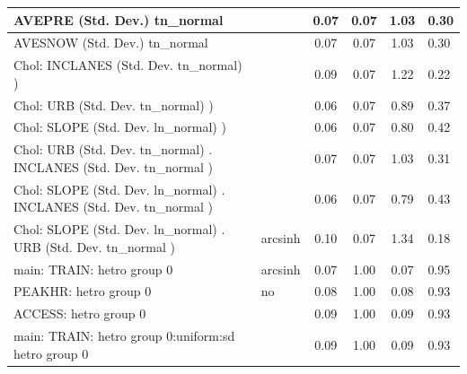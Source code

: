 \begin{table}
\begin{center}
\begin{tabular}{|l|l|c|c|c|l|}
			\hline
			AVEPRE (Std. Dev.) tn_normal &  & 0.07 & 0.07 & 1.03 & 0.30 \\
			\hline
			AVESNOW (Std. Dev.) tn_normal &  & 0.07 & 0.07 & 1.03 & 0.30 \\
			\hline
			 Chol: INCLANES (Std. Dev. tn_normal) ) &  & 0.09 & 0.07 & 1.22 & 0.22 \\
			\hline
			 Chol: URB (Std. Dev. tn_normal) ) &  & 0.06 & 0.07 & 0.89 & 0.37 \\
			\hline
			 Chol: SLOPE (Std. Dev. ln_normal) ) &  & 0.06 & 0.07 & 0.80 & 0.42 \\
			\hline
			 Chol: URB (Std. Dev. tn_normal) . INCLANES (Std. Dev.   tn_normal ) &  & 0.07 & 0.07 & 1.03 & 0.31 \\
			\hline
			 Chol: SLOPE (Std. Dev. ln_normal) . INCLANES (Std. Dev.   tn_normal ) &  & 0.06 & 0.07 & 0.79 & 0.43 \\
			\hline
			 Chol: SLOPE (Std. Dev. ln_normal) . URB (Std. Dev.   tn_normal ) & arcsinh & 0.10 & 0.07 & 1.34 & 0.18 \\
			\hline
			main: TRAIN: hetro group 0 & arcsinh & 0.07 & 1.00 & 0.07 & 0.95 \\
			\hline
			PEAKHR: hetro group 0 & no & 0.08 & 1.00 & 0.08 & 0.93 \\
			\hline
			ACCESS: hetro group 0 &  & 0.09 & 1.00 & 0.09 & 0.93 \\
			\hline
			main: TRAIN: hetro group 0:uniform:sd  hetro group 0 &  & 0.09 & 1.00 & 0.09 & 0.93 \\
			\hline
		\end{tabular}
	\end{center}
\end{table}
